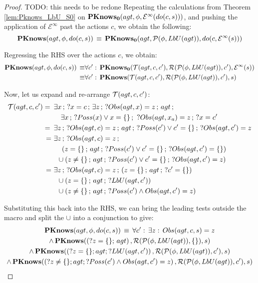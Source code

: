 \begin{proof}
TODO: this needs to be redone Repeating the calculations from Theorem
\ref{lem:Pknows_LbU_S0} on $\mathbf{PKnows_{0}}(agt,\phi,\mathcal{E}^{\infty}(do(c,s)))$,
and pushing the application of $\mathcal{E}^{\infty}$ past the actions
$c$, we obtain the following:\[
\mathbf{PKnows}(agt,\phi,do(c,s))\,\equiv\,\mathbf{PKnows_{0}}(agt,\mathcal{P}(\phi,LbU(agt)),do(c,\mathcal{E}^{\infty}(s)))\]


Regressing the RHS over the actions $c$, we obtain:\begin{align*}
\mathbf{PKnows}(agt,\phi,do(c,s))\,\equiv & \forall c':\,\mathbf{PKnows_{0}}(\mathcal{T}(agt,c,c'),\mathcal{R}(\mathcal{P}(\phi,LbU(agt)),c'),\mathcal{E}^{\infty}(s))\\
\equiv & \forall c':\,\mathbf{PKnows}(\mathcal{T}(agt,c,c'),\mathcal{R}(\mathcal{P}(\phi,LbU(agt)),c'),s)\end{align*}


Now, let us expand and re-arrange $\mathcal{T}(agt,c,c')$:\begin{align*}
\mathcal{T}(agt,c,c')=\,\,\, & \exists x\,;\,?x=c\,;\,\exists z\,;\,?Obs(agt,x)=z\,;\, agt\,;\\
 & \,\,\,\,\,\,\exists x\,;\,?Poss(x)\vee x=\{\}\,;\,\,?Obs(agt,x_{a})=z\,;\,?x=c'\\
=\,\,\, & \exists z\,;\,?Obs(agt,c)=z\,;\, agt\,;\,?Poss(c')\vee c'=\{\}\,;\,?Obs(agt,c')=z\\
=\,\, & \exists z\,;\,?Obs(agt,c)=z\,;\\
 & \,\,\,\,\,\,\left(z=\{\}\,;\, agt\,;\,?Poss(c')\vee c'=\{\}\,;\,?Obs(agt,c')=\{\}\right)\\
 & \,\,\,\cup\left(z\neq\{\}\,;\, agt\,;\,?Poss(c')\vee c'=\{\}\,;\,?Obs(agt,c')=z\right)\\
=\,\, & \exists z\,;\,?Obs(agt,c)=z\,;\,\left(z=\{\}\,;\, agt\,;\,?c'=\{\}\right)\\
 & \,\,\,\cup\left(z=\{\}\,;\, agt\,;\,?LbU(agt,c')\right)\\
 & \,\,\,\cup\left(z\neq\{\}\,;\, agt\,;\,?Poss(c')\wedge Obs(agt,c')=z\right)\end{align*}


Substituting this back into the RHS, we can bring the leading tests
outside the macro and split the $\cup$ into a conjunction to give:\begin{multline*}
\mathbf{PKnows}(agt,\phi,do(c,s))\,\equiv\,\forall c':\,\exists z:\, Obs(agt,c,s)=z\\
\wedge\,\mathbf{PKnows}(\left(?z=\{\};\, agt\right),\mathcal{R}(\mathcal{P}(\phi,LbU(agt)),\{\}),s)\\
\wedge\,\mathbf{PKnows}(\left(?z=\{\};agt;?LbU(agt,c')\right),\mathcal{R}(\mathcal{P}(\phi,LbU(agt)),c'),s)\\
\wedge\,\mathbf{PKnows}(\left(?z\neq\{\};agt;?Poss(c')\wedge Obs(agt,c')=z\right),\mathcal{R}(\mathcal{P}(\phi,LbU(agt)),c'),s)\end{multline*}



\end{proof}
